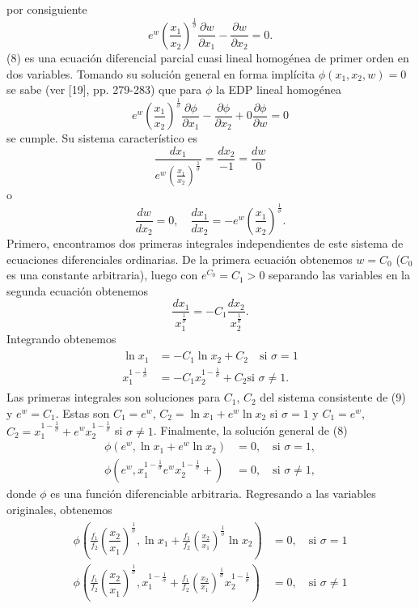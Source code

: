 \documentclass[a4paper,fleqn]{cas-dc}
\begin{document}
por consiguiente
\begin{equation}
e^{w}{\left(\frac{x_{1}}{x_{2}}\right)}^{\frac{1}{\sigma}}\frac{\partial w}{\partial x_{1}}-\frac{\partial w}{\partial x_{2}}=0.
\end{equation}
(8) es una ecuación diferencial parcial cuasi lineal homogénea de primer orden en dos variables. Tomando su solución general en forma implícita $\phi\left(x_{1},x_{2},w\right)=0$ se sabe (ver [19], pp. 279-283) que para $\phi$ la EDP lineal homogénea \[ e^{w}{\left(\dfrac{x_{1}}{x_{2}}\right)}^{\frac{1}{\sigma}}\frac{\partial\phi}{\partial x_{1}}-\frac{\partial\phi}{\partial x_{2}}+0\frac{\partial\phi}{\partial w}=0 \]
se cumple. Su sistema característico es \[ \frac{dx_{1}}{e^{w}{\left(\frac{x_{1}}{x_{2}}\right)}^{\frac{1}{\sigma}}}=\dfrac{dx_{2}}{-1}=\frac{dw}{0} \] o \[ \frac{dw}{dx_{2}}=0,\quad\frac{dx_{1}}{dx_{2}}=-e^{w}{\left(\frac{x_{1}}{x_{2}}\right)}^{\frac{1}{\sigma}}. \] Primero, encontramos dos primeras integrales independientes de este sistema de ecuaciones diferenciales ordinarias. De la primera ecuación obtenemos $w=C_{0}$ ($C_{0}$ es una constante arbitraria), luego con $e^{C_{0}}=C_{1}>0$ separando las variables en la segunda ecuación obtenemos \[ \frac{dx_{1}}{x^{\frac{1}{\sigma}}_{1}}=-C_{1}\frac{dx_{2}}{x^{\frac{1}{\sigma}}_{2}}. \] Integrando obtenemos
\begin{align}
\begin{split}
\ln x_{1}&=-C_{1}\ln x_{2}+C_{2}\quad\text{si }\sigma=1\\
x^{1-\frac{1}{\sigma}}_{1}&=-C_{1}x^{1-\frac{1}{\sigma}}_{2}+C_{2}\text{si }\sigma\neq1.
\end{split}
\end{align}
Las primeras integrales son soluciones para $C_{1}$, $C_{2}$ del sistema consistente de (9) y $e^{w}=C_{1}$. Estas son $C_{1}=e^{w}$, $C_{2}=\ln x_{1}+e^{w}\ln x_{2}$ si $\sigma=1$ y $C_{1}=e^{w}$, $C_{2}=x^{1-\frac{1}{\sigma}}_{1}+e^{w}x^{1-\frac{1}{\sigma}}_{2}$ si $\sigma\neq1$. Finalmente, la solución general de (8)
\begin{align*}
\phi\left(e^{w},\ln x_{1}+e^{w}\ln x_{2}\right)&=0,\quad\text{si }\sigma=1,\\
\phi\left(e^{w},x^{1-\frac{1}{\sigma}}_{1}e^{w}x^{1-\frac{1}{\sigma}}_{2}+\right)&=0,\quad\text{si }\sigma\neq1,
\end{align*}
donde $\phi$ es una función diferenciable arbitraria. Regresando a las variables originales, obtenemos
\begin{align}
\begin{split}
\phi\left(\frac{f_{1}}{f_{2}}{\left(\dfrac{x_{2}}{x_{1}}\right)}^{\frac{1}{\sigma}},\ln x_{1}+\frac{f_{1}}{f_{2}}{\left(\frac{x_{2}}{x_{1}}\right)}^{\frac{1}{\sigma}}\ln x_{2}\right)
&=0,\quad\text{si }\sigma=1\\
\phi\left(\frac{f_{1}}{f_{2}}{\left(\dfrac{x_{2}}{x_{1}}\right)}^{\frac{1}{\sigma}},x^{1-\frac{1}{\sigma}}_{1}+\frac{f_{1}}{f_{2}}{\left(\frac{x_{2}}{x_{1}}\right)}^{\frac{1}{\sigma}}x^{1-\frac{1}{\sigma}}_{2}\right)
&=0,\quad\text{si }\sigma\neq1
\end{split}
\end{align}
\end{document}
